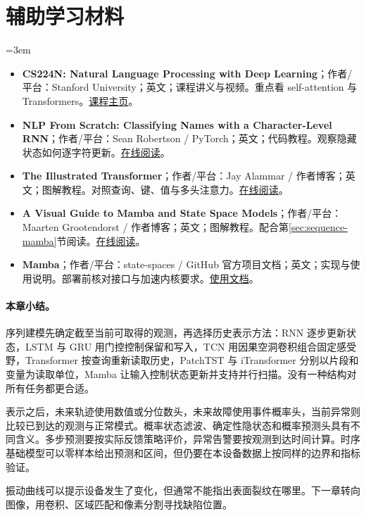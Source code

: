 \section*{辅助学习材料}
\begingroup
\emergencystretch=3em
\begin{itemize}
\item \textbf{CS224N: Natural Language Processing with Deep Learning}；作者/平台：Stanford University；英文；课程讲义与视频。重点看 self-attention 与 Transformers。\href{https://web.stanford.edu/class/cs224n/}{课程主页}。
\item \textbf{NLP From Scratch: Classifying Names with a Character-Level RNN}；作者/平台：Sean Robertson / PyTorch；英文；代码教程。观察隐藏状态如何逐字符更新。\href{https://docs.pytorch.org/tutorials/intermediate/char\_rnn\_classification\_tutorial.html}{在线阅读}。
\item \textbf{The Illustrated Transformer}；作者/平台：Jay Alammar / 作者博客；英文；图解教程。对照查询、键、值与多头注意力。\href{https://jalammar.github.io/illustrated-transformer/}{在线阅读}。
\item \textbf{A Visual Guide to Mamba and State Space Models}；作者/平台：Maarten Grootendorst / 作者博客；英文；图解教程。配合第\ref{sec:sequence-mamba}节阅读。\href{https://www.maartengrootendorst.com/blog/mamba/}{在线阅读}。
\item \textbf{Mamba}；作者/平台：state-spaces / GitHub 官方项目文档；英文；实现与使用说明。部署前核对接口与加速内核要求。\href{https://github.com/state-spaces/mamba\#usage}{使用文档}。
\end{itemize}
\endgroup
\paragraph{本章小结。}
序列建模先确定截至当前可取得的观测，再选择历史表示方法：RNN 逐步更新状态，LSTM 与 GRU 用门控控制保留和写入，TCN 用因果空洞卷积组合固定感受野，Transformer 按查询重新读取历史，PatchTST 与 iTransformer 分别以片段和变量为读取单位，Mamba 让输入控制状态更新并支持并行扫描。没有一种结构对所有任务都更合适。

表示之后，未来轨迹使用数值或分位数头，未来故障使用事件概率头，当前异常则比较已到达的观测与正常模式。概率状态滤波、确定性隐状态和概率预测头具有不同含义。多步预测要按实际反馈策略评价，异常告警要按观测到达时间计算。时序基础模型可以零样本给出预测和区间，但仍要在本设备数据上按同样的边界和指标验证。

振动曲线可以提示设备发生了变化，但通常不能指出表面裂纹在哪里。下一章转向图像，用卷积、区域匹配和像素分割寻找缺陷位置。
